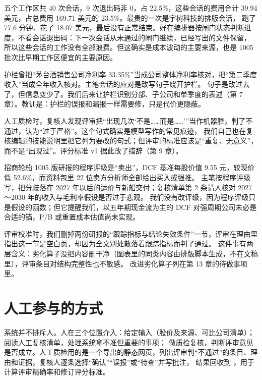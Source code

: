 \begin{story}
五个工作区共 40 次会话，9 次退出码非 0，占 22.5\%，这些会话的费用合计 39.94 美元，占总费用 169.71 美元的 23.5\%。最贵的一次是宇树科技的排版会话，
跑了 77.6 分钟、花了 18.07 美元，最后没有正常结束。好在编排器按闸门状态判断进度，不看会话退出码：下一次会话从未通过的闸门继续，已经写出的文件保留，
所以这些会话的工作没有全部浪费。但这确实是成本波动的主要来源，也是 1005 批次比早期工作区便宜的主要原因。
\end{story}

\begin{story}
护栏曾把“茅台酒销售公司净利率 33.35\%”当成公司整体净利率核对，把“第二季度收入”当成全年收入核对。主笔会话的应对是改写句子绕开护栏。
句子是改过去了，但信息变少了。我们后来让护栏识别分部、子公司和单季度的表述（第 7 章）。教训是：护栏的误报和漏报一样需要修，只是代价更隐蔽。
\end{story}

\begin{story}[评审嫌“不是……而是……”太多]
人工质检时，复核人发现评审把“出现几次‘不是……而是……’”当作机器腔，判了不通过，认为“过于严格”。这个句式确实是模型写作的常见痕迹，
我们自己也在复核编辑的技能说明里把它列为要改的句式；但评审的标准应该是“重复、无意义”，而不是“出现过”。评分标准 v1 据此改了措辞（第 9 章）。
\end{story}

\begin{story}
招商轮船 1005 版研报的程序评级是“卖出”，DCF 基准每股价值 9.55 元，较现价低 52.6\%，而资料包里 22 位卖方分析师全部给出买入或强推。
主笔按程序评级写，把分歧落在 2027 年以后的运价与新船交付；复核清单第 2 条请人核对 2027～2030 年的收入与毛利率假设是否过于悲观。
我们没有改评级，因为程序评级只是假设的函数；但它提醒我们，以五年期现金流为主的 DCF 对强周期公司未必是合适的锚，P/B 或重置成本估值尚未实现。
\end{story}

\begin{story}
评审校准时，我们删掉两份研报的“跟踪指标与结论失效条件”一节，评审在理由里指出这一节是空白页，却因为全文别处散落着跟踪指标而判了通过。
这件事有两层含义：劣化算子没把内容删干净（图表里的同类内容由排版脚本生成，不在文稿里），评审条目对结构完整性也不敏感。
改进劣化算子列在第 13 章的待做事项里。
\end{story}

\section{人工参与的方式}

系统并不排斥人。人在三个位置介入：给定输入（股价及来源、可比公司清单）；阅读人工复核清单，处理系统拿不准但重要的事项；
做质检复核，判断评审意见是否成立。人工质检用的是一个导出的静态网页，列出评审判“不通过”的条目、理由和证据，复核人逐条选择“确认”“误报”或“待查”并写批注，
结果回收到 ，用于计算评审精确率和修订评分标准。

